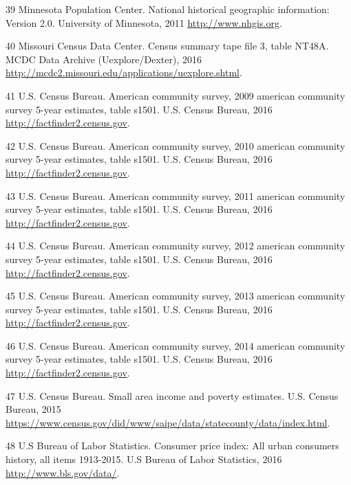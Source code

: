 \documentclass[]{article}
\begin{document}
\hypertarget{ref-minnesotaux5fpopulationux5fcenterux5fnationalux5f2011}{}
39 Minnesota Population Center. National historical geographic
information: Version 2.0. University of Minnesota, 2011
\url{http://www.nhgis.org}.

\hypertarget{ref-missouriux5fcensusux5fdataux5fcenterux5fcensusux5f2016}{}
40 Missouri Census Data Center. Census summary tape file 3, table NT48A.
MCDC Data Archive (Uexplore/Dexter), 2016
\url{http://mcdc2.missouri.edu/applications/uexplore.shtml}.

\hypertarget{ref-u.s.ux5fcensusux5fbureauux5famericanux5f2016}{}
41 U.S. Census Bureau. American community survey, 2009 american
community survey 5-year estimates, table s1501. U.S. Census Bureau, 2016
\url{http://factfinder2.census.gov}.

\hypertarget{ref-u.s.ux5fcensusux5fbureauux5famericanux5f2016-1}{}
42 U.S. Census Bureau. American community survey, 2010 american
community survey 5-year estimates, table s1501. U.S. Census Bureau, 2016
\url{http://factfinder2.census.gov}.

\hypertarget{ref-u.s.ux5fcensusux5fbureauux5famericanux5f2016-2}{}
43 U.S. Census Bureau. American community survey, 2011 american
community survey 5-year estimates, table s1501. U.S. Census Bureau, 2016
\url{http://factfinder2.census.gov}.

\hypertarget{ref-u.s.ux5fcensusux5fbureauux5famericanux5f2016-3}{}
44 U.S. Census Bureau. American community survey, 2012 american
community survey 5-year estimates, table s1501. U.S. Census Bureau, 2016
\url{http://factfinder2.census.gov}.

\hypertarget{ref-u.s.ux5fcensusux5fbureauux5famericanux5f2016-4}{}
45 U.S. Census Bureau. American community survey, 2013 american
community survey 5-year estimates, table s1501. U.S. Census Bureau, 2016
\url{http://factfinder2.census.gov}.

\hypertarget{ref-u.s.ux5fcensusux5fbureauux5famericanux5f2016-5}{}
46 U.S. Census Bureau. American community survey, 2014 american
community survey 5-year estimates, table s1501. U.S. Census Bureau, 2016
\url{http://factfinder2.census.gov}.

\hypertarget{ref-u.s.ux5fcensusux5fbureauux5fsmallux5f2015}{}
47 U.S. Census Bureau. Small area income and poverty estimates. U.S.
Census Bureau, 2015
\url{https://www.census.gov/did/www/saipe/data/statecounty/data/index.html}.

\hypertarget{ref-u.sux5fbureauux5fofux5flaborux5fstatisticsux5fconsumerux5f2016}{}
48 U.S Bureau of Labor Statistics. Consumer price index: All urban
consumers history, all items 1913-2015. U.S Bureau of Labor Statistics,
2016 \url{http://www.bls.gov/data/}.
\end{document}
